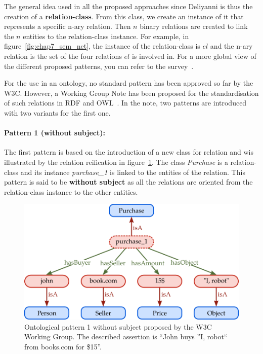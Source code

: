 The general idea used in all the proposed approaches since Deliyanni is thus the creation of a \textbf{relation-class}. From this class, we create an instance of it that represents a specific n-ary relation. Then $n$ binary relations are created to link the $n$ entities to the relation-class instance. For example, in figure~\ref{fig:chap7_sem_net}, the instance of the relation-class is $el$ and the n-ary relation is the set of the four relations $el$ is involved in. For a more global view of the different proposed patterns, you can refer to the survey~\cite{gangemi_2013_multi}.

For the use in an ontology, no standard pattern has been approved so far by the W3C. However, a Working Group Note has been proposed for the standardisation of such relations in RDF and OWL~\cite{w3c_2006_defining}. In the note, two patterns are introduced with two variants for the first one.

\paragraph{Pattern 1 (without subject):} The first pattern is based on the introduction of a new class for relation and wis illustrated by the relation reification in figure~\ref{fig:chap7_w3c_p2}. The class \textit{Purchase} is a relation-class and its instance \textit{purchase\_1} is linked to the entities of the relation. This pattern is said to be \textbf{without subject} as all the relations are oriented from the relation-class instance to the other entities.

\begin{figure}[ht!]
\centering
\includegraphics[scale=0.45]{figures/chapter7/w3c_p2.png}
\caption{\label{fig:chap7_w3c_p2} Ontological pattern 1 without subject proposed by the W3C Working Group. The described assertion is ``John buys ''I, robot`` from books.com for \$15''.}
\end{figure}

